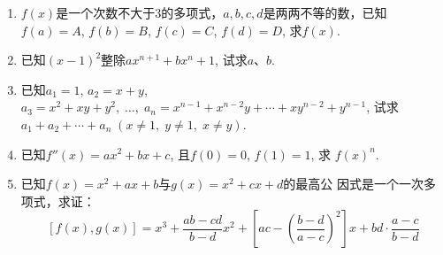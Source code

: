 \begin{enumerate}
\item $f(x)$是一个次数不大于3的多项式，$a,b,c,d$是两两不等的数，已知$f(a)=A$, $f(b)=B$, $f(c)=C$, $f(d)=D$, 求$f(x)$.
\item 已知$(x-1)^2$整除$ax^{n+1}+bx^n+1$, 试求$a$、$b$.
\item 已知$a_1=1$, $a_2=x+y$, $a_3=x^2+xy+y^2,\; \ldots,\; a_n=x^{n-1}+x^{n-2}y+\cdots +xy^{n-2}+y^{n-1}$, 试求$a_1+a_2+\cdots +a_n\; (x\ne 1,\; y\ne 1,\;x\ne y)$.
\item 已知$f''(x)=ax^2+bx+c$, 且$f(0)=0$, $f(1)=1$, 求
$f (x)^n$.
\item 已知$f(x)=x^2+ax+b$与$g(x)=x^2+cx+d$的最高公
因式是一个一次多项式，求证：
\[[f(x),g(x)]=x^3+\frac{ab-cd}{b-d}x^2+\left[ac-\left(\frac{b-d}{a-c}\right)^2\right]x+bd\cdot \frac{a-c}{b-d}\]
\end{enumerate}